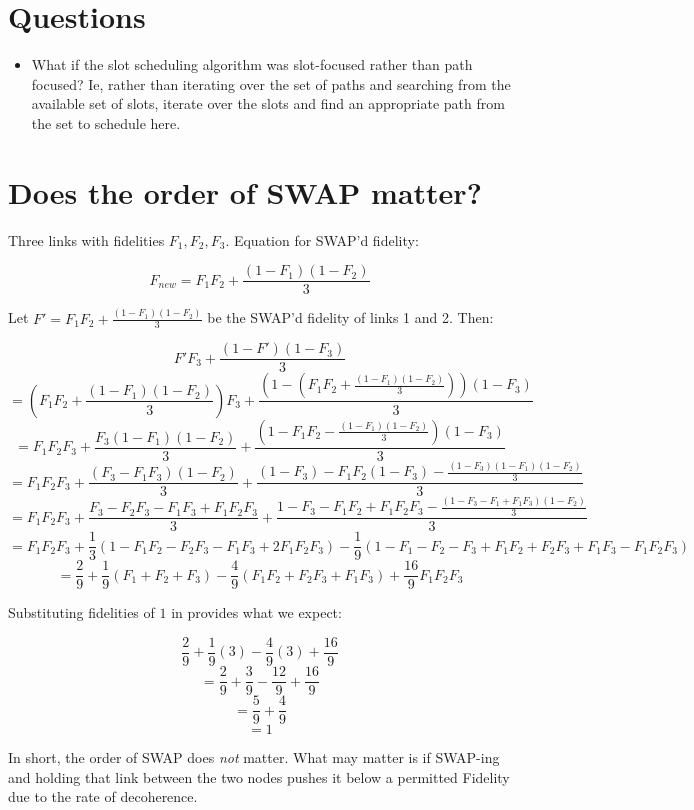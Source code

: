 \documentclass{article}
\begin{document}
\section{Questions}
\begin{itemize}
    \item What if the slot scheduling algorithm was slot-focused rather than path focused?  Ie, rather than iterating over the set of paths and searching from the available set of slots, iterate over the slots and find an appropriate path from the set to schedule here.
\end{itemize}

\section{Does the order of SWAP matter?}
Three links with fidelities $F_1,F_2,F_3$. Equation for SWAP'd fidelity:

$$F_{new} = F_1F_2 + \frac{(1-F_1)(1-F_2)}{3}$$

Let $F' = F_1 F_2 + \frac{(1-F_1)(1-F_2)}{3}$ be the SWAP'd fidelity of links 1 and 2. Then:

    $$F' F_3 + \frac{(1-F')(1-F_3)}{3}$$
    $$=(F_1 F_2 + \frac{(1-F_1)(1-F_2)}{3})F_3 + \frac{(1-(F_1 F_2 + \frac{(1-F_1)(1-F_2)}{3}))(1-F_3)}{3}$$
    $$=F_1 F_2F_3 + \frac{F_3(1-F_1)(1-F_2)}{3} + \frac{(1-F_1 F_2 - \frac{(1-F_1)(1-F_2)}{3})(1-F_3)}{3}$$
    $$=F_1 F_2F_3 + \frac{(F_3-F_1F_3)(1-F_2)}{3} + \frac{(1-F_3)-F_1 F_2(1-F_3) - \frac{(1-F_3)(1-F_1)(1-F_2)}{3}}{3}$$
    $$=F_1 F_2F_3 + \frac{F_3 - F_2F_3 - F_1F_3 + F_1F_2F_3}{3} + \frac{1-F_3-F_1 F_2+F_1F_2F_3 - \frac{(1-F_3-F_1+F_1F_3)(1-F_2)}{3}}{3}$$
    $$=F_1 F_2F_3 + \frac{1}{3}(1 - F_1F_2 - F_2F_3 - F_1F_3 + 2F_1F_2F_3) - \frac{1}{9}(1 - F_1 - F_2 - F_3 + F_1F_2 + F_2F_3 + F_1F_3 - F_1F_2F_3)$$
    $$=\frac{2}{9} + \frac{1}{9}(F_1 + F_2 + F_3) - \frac{4}{9}(F_1F_2 + F_2F_3 + F_1F_3) + \frac{16}{9}F_1 F_2F_3$$

Substituting fidelities of $1$ in provides what we expect:

$$\frac{2}{9} + \frac{1}{9}(3) - \frac{4}{9}(3) + \frac{16}{9}$$
$$=\frac{2}{9} + \frac{3}{9} - \frac{12}{9} + \frac{16}{9}$$
$$=\frac{5}{9} + \frac{4}{9}$$
$$=1$$

In short, the order of SWAP does \emph{not} matter.  What may matter is if SWAP-ing and holding that link between the two nodes pushes it below a permitted Fidelity due to the rate of decoherence.
\end{document}
